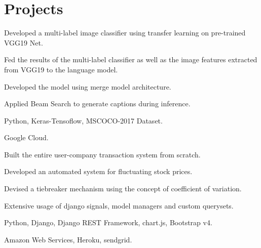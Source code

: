 
\section{Projects}

\begin{tightemize}
\item Developed a multi-label image classifier using transfer learning on pre-trained VGG19 Net.
\item Fed the results of the multi-label classifier as well as the image features extracted from VGG19 to the language model.
\item Developed the model using merge model architecture.
\item Applied Beam Search to generate captions during inference.
\item {} Python, Keras-Tensoflow, MSCOCO-2017 Dataset.
\item {} Google Cloud.
\end{tightemize}
\sectionsep

\begin{tightemize}
\item Built the entire user-company transaction system from scratch.
\item Developed an automated system for fluctuating stock prices.
\item Devised a tiebreaker mechanism using the concept of coefficient of variation.
\item Extensive usage of django signals, model managers and custom querysets.
\item {} Python, Django, Django REST Framework, chart.js, Bootstrap v4.
\item {} Amazon Web Services, Heroku, sendgrid.
\end{tightemize}
\sectionsep

